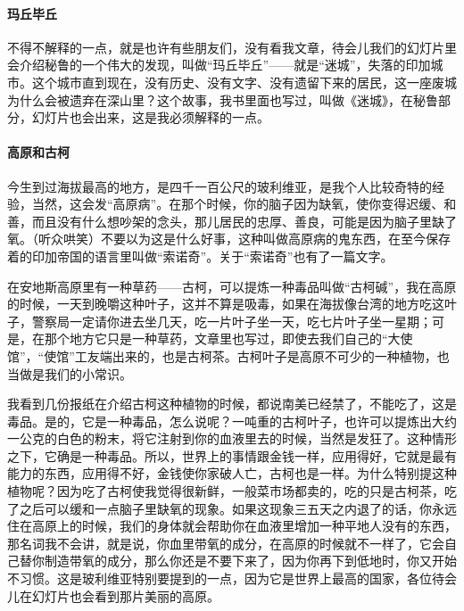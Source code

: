 \paragraph*{玛丘毕丘}
\par 不得不解释的一点，就是也许有些朋友们，没有看我文章，待会儿我们的幻灯片里会介绍秘鲁的一个伟大的发现，叫做“玛丘毕丘”——就是“迷城”，失落的印加城市。这个城市直到现在，没有历史、没有文字、没有遗留下来的居民，这一座废城为什么会被遗弃在深山里？这个故事，我书里面也写过，叫做《迷城》，在秘鲁部分，幻灯片也会出来，这是我必须解释的一点。
\paragraph*{高原和古柯}
\par 今生到过海拔最高的地方，是四千一百公尺的玻利维亚，是我个人比较奇特的经验，当然，这会发“高原病”。在那个时候，你的脑子因为缺氧，使你变得迟缓、和善，而且没有什么想吵架的念头，那儿居民的忠厚、善良，可能是因为脑子里缺了氧。（听众哄笑）不要以为这是什么好事，这种叫做高原病的鬼东西，在至今保存着的印加帝国的语言里叫做“索诺奇”。关于“索诺奇”也有了一篇文字。
\par 在安地斯高原里有一种草药——古柯，可以提炼一种毒品叫做“古柯碱”，我在高原的时候，一天到晚嚼这种叶子，这并不算是吸毒，如果在海拔像台湾的地方吃这叶子，警察局一定请你进去坐几天，吃一片叶子坐一天，吃七片叶子坐一星期；可是，在那个地方它只是一种草药，文章里也写过，即使去我们自己的“大使馆”，“使馆”工友端出来的，也是古柯茶。古柯叶子是高原不可少的一种植物，也当做是我们的小常识。
\par 我看到几份报纸在介绍古柯这种植物的时候，都说南美已经禁了，不能吃了，这是毒品。是的，它是一种毒品，怎么说呢？一吨重的古柯叶子，也许可以提炼出大约一公克的白色的粉末，将它注射到你的血液里去的时候，当然是发狂了。这种情形之下，它确是一种毒品。所以，世界上的事情跟金钱一样，应用得好，它就是最有能力的东西，应用得不好，金钱使你家破人亡，古柯也是一样。为什么特别提这种植物呢？因为吃了古柯使我觉得很新鲜，一般菜市场都卖的，吃的只是古柯茶，吃了之后可以缓和一点脑子里缺氧的现象。如果这现象三五天之内退了的话，你永远住在高原上的时候，我们的身体就会帮助你在血液里增加一种平地人没有的东西，那名词我不会讲，就是说，你血里带氧的成分，在高原的时候就不一样了，它会自己替你制造带氧的成分，那么你还是不要下来了，因为你再下到低地时，你又开始不习惯。这是玻利维亚特别要提到的一点，因为它是世界上最高的国家，各位待会儿在幻灯片也会看到那片美丽的高原。
